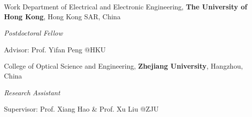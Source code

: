 \begin{rubric}{Work}
	\entry*[2024/04 -- Present]%
	Department of Electrical and Electronic Engineering, \textbf{The University of Hong Kong}, Hong Kong SAR, China
	\par \textit{Postdoctoral Fellow}
	\par Advisor: Prof. Yifan Peng @HKU

    \entry*[2024/01 -- 2024/03]%
	College of Optical Science and Engineering, \textbf{Zhejiang University}, Hangzhou, China
	\par \textit{Research Assistant}
	\par Supervisor: Prof. Xiang Hao \& Prof. Xu Liu @ZJU
\end{rubric}
